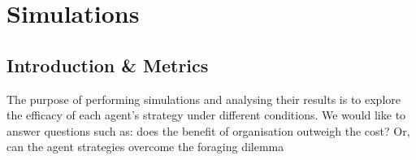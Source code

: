 \chapter{Simulations}
\section{Introduction \& Metrics}
The purpose of performing simulations and analysing their results is to explore the efficacy of each agent's strategy under different conditions. We would like to answer questions such as: does the benefit of organisation outweigh the cost? Or, can the agent strategies overcome the foraging dilemma 